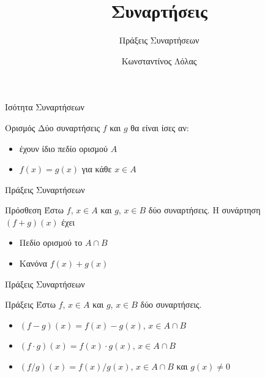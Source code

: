 \documentclass[greek]{beamer}
\title{Συναρτήσεις}
\subtitle{Πράξεις Συναρτήσεων}
\author[Λόλας]{Κωνσταντίνος Λόλας }
\institute[$10^ο$ ΓΕΛ]{$10^ο$ ΓΕΛ Θεσσαλονίκης}
\date{}
\begin{document}
\begin{frame}
      \titlepage
\end{frame}
\begin{frame}{Ισότητα Συναρτήσεων}
      \begin{block}{Ορισμός}
            Δύο συναρτήσεις $f$ και $g$ θα είναι ίσες αν:
            \begin{itemize}
                  \item έχουν ίδιο πεδίο ορισμού $Α$
                  \item $f(x)=g(x)$ για κάθε $x\in Α$
            \end{itemize}
      \end{block}
\end{frame}

\begin{frame}{Πράξεις Συναρτήσεων}
      \begin{block}{Πρόσθεση}
            Έστω $f$, $x\in Α$ και $g$, $x\in Β$ δύο συναρτήσεις. Η συνάρτηση $(f+g)(x)$ έχει
            \begin{itemize}
                  \item Πεδίο ορισμού το $A\cap Β$
                  \item Κανόνα $f(x)+g(x)$
            \end{itemize}
      \end{block}
\end{frame}

\begin{frame}{Πράξεις Συναρτήσεων}
      \begin{block}{Πράξεις}
            Έστω $f$, $x\in Α$ και $g$, $x\in Β$ δύο συναρτήσεις.
            \begin{itemize}
                  \item $(f-g)(x)=f(x)-g(x)$, $x\in A\cap Β$
                  \item $(f\cdot g)(x)=f(x)\cdot g(x)$, $x\in A\cap Β$
                  \item $(f/g)(x)=f(x)/g(x)$, $x\in A\cap Β$ και $g(x)\ne 0$
            \end{itemize}
      \end{block}
\end{frame}
\end{document}
